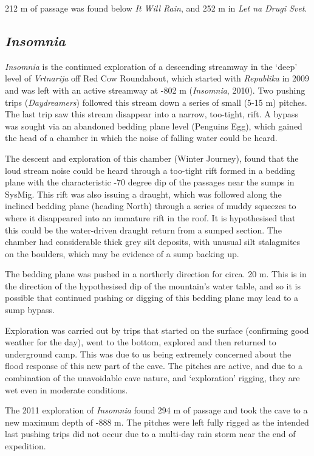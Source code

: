 212 m of passage was found below \emph{It Will Rain}, and 252 m in
\emph{Let na Drugi Svet}.

\hypertarget{insomnia}{%
\subsection{\texorpdfstring{\emph{Insomnia}}{Insomnia}}\label{insomnia}}

\emph{Insomnia} is the continued exploration of a descending streamway
in the `deep' level of \emph{Vrtnarija} off Red Cow Roundabout, which
started with \emph{Republika} in 2009 and was left with an active
streamway at -802 m (\emph{Insomnia}, 2010). Two pushing trips
(\emph{Daydreamers}) followed this stream down a series of small (5-15
m) pitches. The last trip saw this stream disappear into a narrow,
too-tight, rift. A bypass was sought via an abandoned bedding plane
level (Penguins Egg), which gained the head of a chamber in which the
noise of falling water could be heard.

The descent and exploration of this chamber (Winter Journey), found that
the loud stream noise could be heard through a too-tight rift formed in
a bedding plane with the characteristic -70 degree dip of the passages
near the sumps in SysMig. This rift was also issuing a draught, which
was followed along the inclined bedding plane (heading North) through a
series of muddy squeezes to where it disappeared into an immature rift
in the roof. It is hypothesised that this could be the water-driven
draught return from a sumped section. The chamber had considerable thick
grey silt deposits, with unusual silt stalagmites on the boulders, which
may be evidence of a sump backing up.

The bedding plane was pushed in a northerly direction for circa. 20 m.
This is in the direction of the hypothesised dip of the mountain's water
table, and so it is possible that continued pushing or digging of this
bedding plane may lead to a sump bypass.

Exploration was carried out by trips that started on the surface
(confirming good weather for the day), went to the bottom, explored and
then returned to underground camp. This was due to us being extremely
concerned about the flood response of this new part of the cave. The
pitches are active, and due to a combination of the unavoidable cave
nature, and `exploration' rigging, they are wet even in moderate
conditions.

The 2011 exploration of \emph{Insomnia} found 294 m of passage and took
the cave to a new maximum depth of -888 m. The pitches were left fully
rigged as the intended last pushing trips did not occur due to a
multi-day rain storm near the end of expedition.

